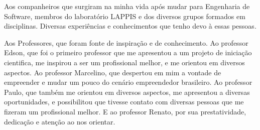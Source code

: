 \begin{agradecimentos}
Aos companheiros que surgiram na minha vida após mudar para Engenharia de Software,
membros do laboratório LAPPIS e dos diversos grupos formados em disciplinas. Diversas
experiências e conhecimentos que tenho devo à essas pessoas.

Aos Professores, que foram fonte de inspiração e de conhecimento. Ao professor
Edson, que foi o primeiro professor que me apresentou a um projeto de iniciação
cientifica, me inspirou a ser um profissional melhor, e me orientou em diversos
aspectos. Ao professor Marcelino, que despertou em mim a vontade de empreender
e mudar um pouco do cenário empreendedor brasileiro. Ao professor Paulo, que
também me orientou em diversos aspectos, me apresentou a diversas oportunidades,
e possibilitou que tivesse contato com diversas pessoas que me fizeram um
profissional melhor. E ao professor Renato, por sua prestatividade, dedicação
e atenção ao nos orientar.
\end{agradecimentos}
